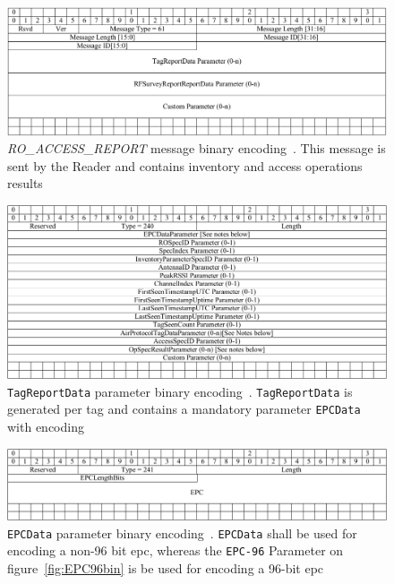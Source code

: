 \begin{figure}[]
    \centering
    \includegraphics[width=\textwidth]{./figs/02-state-of-the-art/RO_ACCESS_REPORT_bin.pdf}
    \caption[\textit{RO\_ACCESS\_REPORT} message binary encoding]{\textit{RO\_ACCESS\_REPORT} message binary encoding~\cite{LowLevelReader}. This message is sent by the Reader and contains inventory and access operations results} 
    \label{fig:ROACCESSREPORTbin}
\end{figure}

\begin{figure}[]
    \centering
    \includegraphics[width=\textwidth]{./figs/02-state-of-the-art/TagReportData_bin.pdf}
    \caption[\texttt{TagReportData} parameter binary encoding]{\texttt{TagReportData} parameter binary encoding~\cite{LowLevelReader}. \texttt{TagReportData} is generated per tag and contains a mandatory parameter \texttt{EPCData} with encoding} 
    \label{fig:TagReportDatabin}
\end{figure}

\begin{figure}[]
    \centering
    \includegraphics[width=\textwidth]{./figs/02-state-of-the-art/EPCDataParameter_bin.pdf}
    \caption[\texttt{EPCData} parameter binary encoding]{\texttt{EPCData} parameter binary encoding~\cite{LowLevelReader}. \texttt{EPCData} shall be used for encoding a non-96 bit \ac{epc}, whereas the \texttt{EPC-96} Parameter on figure~\ref{fig:EPC96bin} is be used for encoding a 96-bit \ac{epc}} 
    \label{fig:EPCDatabin}
\end{figure}

